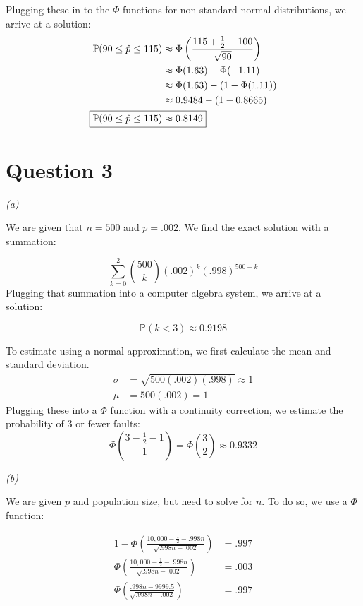 \documentclass[titlepage, 12pt, leqno]{article}
\begin{document}
Plugging these in to the $\Phi$ functions for non-standard normal distributions,
we arrive at a solution:
\begin{align*}
    \mathbb{P}(90 \le \hat p \le 115) &\approx \Phi\left(\frac{115+\frac{1}{2} -
    100}{\sqrt{90}}\right) \\
    &\approx \Phi(1.63) - \Phi(-1.11) \\
    &\approx \Phi(1.63)-(1-\Phi(1.11)) \\
    &\approx 0.9484 - (1-0.8665) \\
            \Aboxed{\mathbb{P}(90 \le \hat p \le 115) &\approx 0.8149}
\end{align*}

\pagebreak
\section{Question 3}
\textit{(a)} 

We are given that $n = 500$ and $p = .002$. We find the exact solution with a
summation:

\[
    \sum_{k=0}^{2}\binom{500}{k}(.002)^k(.998)^{500-k}
\]
Plugging that summation into a computer algebra system, we arrive at a solution:

\[
    \boxed{\mathbb{P}(k<3) \approx 0.9198} 
\]

To estimate using a normal approximation, we first calculate the mean and 
standard deviation.
\begin{align*}
    \sigma &= \sqrt{500(.002)(.998)} \approx 1 \\
    \mu &= 500(.002) = 1
\end{align*}
Plugging these into a $\Phi$ function with a continuity correction, we estimate
the probability of 3 or fewer faults:
\[
    \Phi\left(\frac{3-\frac{1}{2} -1}{1}\right) = \Phi\left(\frac{3}{2} \right)
    \approx \boxed{0.9332}
\]

\textit{(b)} 

We are given $p$ and population size, but need to solve for $n$. To do so, we use
a $\Phi$ function:

\begin{align*}
    1 - \Phi\left(\frac{10,000-\frac{1}{2} -.998n}{\sqrt{.998n-.002}}\right)
    &= .997 \\
        \Phi\left(\frac{10,000-\frac{1}{2} -.998n}{\sqrt{.998n-.002}}\right)
                                                                      &= .003 \\
            \Phi\left(\frac{.998n - 9999.5}{\sqrt{.998n-.002}}
        \right) &=.997
\end{align*}
\end{document}
